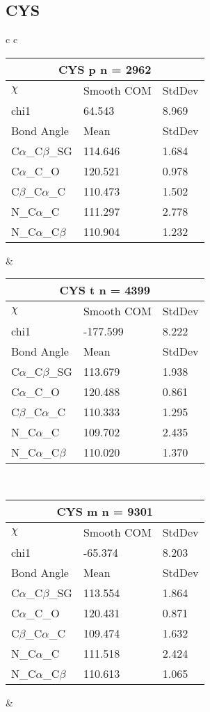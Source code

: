 \newpage
\subsection{CYS}

\begin{longtable}{ c c }

  \begin{tabular}{ l l l }
  \toprule
  \multicolumn{3}{c}{CYS \textbf{p} n = 2962} \\ \toprule
  $\chi$       & Smooth COM & StdDev \\ \midrule
  chi1 & 64.543 & 8.969 \\ \midrule
  Bond Angle   & Mean     & StdDev \\ \midrule
  C$\alpha$\_C$\beta$\_SG & 114.646 & 1.684\\
  C$\alpha$\_C\_O & 120.521 & 0.978\\
  C$\beta$\_C$\alpha$\_C & 110.473 & 1.502\\
  N\_C$\alpha$\_C & 111.297 & 2.778\\
  N\_C$\alpha$\_C$\beta$ & 110.904 & 1.232\\
  \bottomrule
  \end{tabular}
  &
  \begin{tabular}{ l l l }
  \toprule
  \multicolumn{3}{c}{CYS \textbf{t} n = 4399} \\ \toprule
  $\chi$       & Smooth COM & StdDev \\ \midrule
  chi1 & -177.599 & 8.222 \\ \midrule
  Bond Angle   & Mean     & StdDev \\ \midrule
  C$\alpha$\_C$\beta$\_SG & 113.679 & 1.938\\
  C$\alpha$\_C\_O & 120.488 & 0.861\\
  C$\beta$\_C$\alpha$\_C & 110.333 & 1.295\\
  N\_C$\alpha$\_C & 109.702 & 2.435\\
  N\_C$\alpha$\_C$\beta$ & 110.020 & 1.370\\
  \bottomrule
  \end{tabular}
  \\
  \begin{tabular}{ l l l }
  \toprule
  \multicolumn{3}{c}{CYS \textbf{m} n = 9301} \\ \toprule
  $\chi$       & Smooth COM & StdDev \\ \midrule
  chi1 & -65.374 & 8.203 \\ \midrule
  Bond Angle   & Mean     & StdDev \\ \midrule
  C$\alpha$\_C$\beta$\_SG & 113.554 & 1.864\\
  C$\alpha$\_C\_O & 120.431 & 0.871\\
  C$\beta$\_C$\alpha$\_C & 109.474 & 1.632\\
  N\_C$\alpha$\_C & 111.518 & 2.424\\
  N\_C$\alpha$\_C$\beta$ & 110.613 & 1.065\\
  \bottomrule
  \end{tabular}
  &
  \\
  
\end{longtable}    

